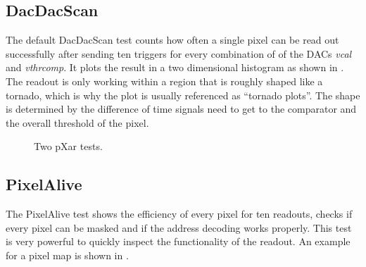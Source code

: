 \subsection{DacDacScan}\label{stornado}
The default DacDacScan test counts how often a single pixel can be read out successfully after sending ten triggers for every combination of of the \ac{DAC}s \textit{vcal} and \textit{vthrcomp}. It plots the result in a two dimensional histogram as shown in . The readout is only working within a region that is roughly shaped like a tornado, which is why the plot is usually referenced as ``tornado plots''. The shape is determined by the difference of time signals  need to get to the comparator and the overall threshold of the pixel. 
\begin{figure}[ht]
	\centering
	\hfill
	\caption{Two pXar tests.}
	\label{ppxartest}
\end{figure}\no
\subsection{PixelAlive}
The PixelAlive test shows the efficiency of every pixel for ten readouts, checks if every pixel can be masked and if the address decoding works properly. This test is very powerful to quickly inspect the functionality of the readout. An example for a pixel map is shown in .
